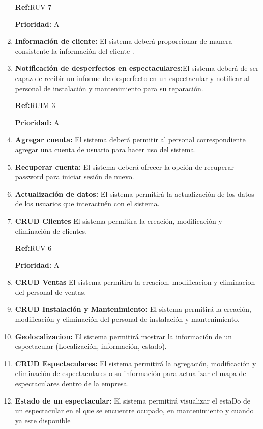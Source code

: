 \begin{enumerate}[leftmargin=2.5cm ,label={\bfseries RF-\arabic*}]
 \textbf{Ref:}RUV-7
 
\textbf{Prioridad:} A
\item \textbf{ Información de cliente:} El sistema deberá proporcionar de manera consistente la información del cliente .
\item \textbf{ Notificación de desperfectos en espectaculares:}El sistema deberá de ser capaz de recibir un informe de desperfecto en un espectacular y notificar al personal de instalación y mantenimiento para su reparación.

 \textbf{Ref:}RUIM-3
 
\textbf{Prioridad:} A
\item \textbf{ Agregar cuenta:} El sistema deberá permitir al personal correspondiente agregar una cuenta de usuario para hacer uso del sistema.
\item \textbf{Recuperar cuenta:} El sistema deberá ofrecer la opción de recuperar password para iniciar sesión de nuevo.
\item \textbf{ Actualización de datos:} El sistema permitirá la actualización de los datos de los usuarios que interactuén con el sistema.

\item \textbf{CRUD Clientes} El sistema permitira la creación, modificación y eliminación de clientes.

 \textbf{Ref:}RUV-6
 
\textbf{Prioridad:} A
\item \textbf{CRUD Ventas} El sistema permitira la creacion, modificacion y eliminacion del personal de ventas.
\item \textbf{CRUD Instalación y Mantenimiento:} El sistema permitirá la creación, modificación y eliminación del personal de instalación y mantenimiento.
\item \textbf{ Geolocalizacion:} El sistema permitirá mostrar la información de un espectacular (Localización, información, estado).
\item \textbf{CRUD Espectaculares:} El sistema permitirá la agregación, modificación y eliminación de espectaculares o su información para actualizar el mapa de espectaculares dentro de la empresa.
\item \textbf{ Estado de un espectacular:} El sistema permitirá visualizar el estaDo de un espectacular en el que se encuentre ocupado, en mantenimiento y cuando ya este disponible

\end{enumerate}
